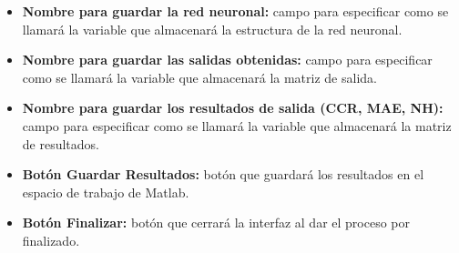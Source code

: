 			\begin{itemize}
				\item \textbf{Nombre para guardar la red neuronal:} campo para especificar como se llamará la variable que almacenará la estructura de la red neuronal.
				\item \textbf{Nombre para guardar las salidas obtenidas:} campo para especificar como se llamará la variable que almacenará la matriz de salida.
				\item \textbf{Nombre para guardar los resultados de salida (CCR, MAE, NH):} campo para especificar como se llamará la variable que almacenará la matriz de resultados.
				\item \textbf{Botón Guardar Resultados:} botón que guardará los resultados en el espacio de trabajo de Matlab.
				\item \textbf{Botón Finalizar:} botón que cerrará la interfaz al dar el proceso por finalizado.
			\end{itemize}
